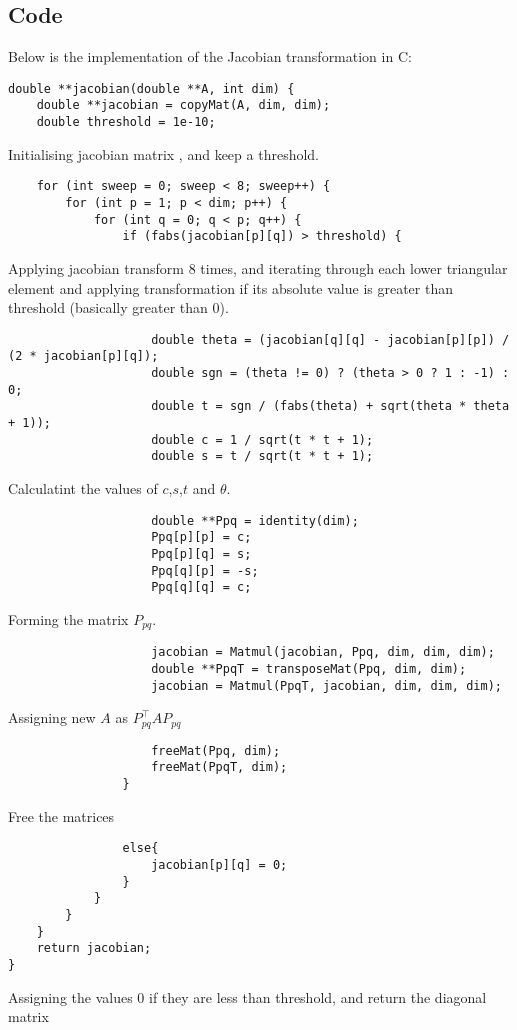 \documentclass[a4paper,12pt]{article}
\theoremstyle{remark}
\begin{document}
\subsection{Code}
Below is the implementation of the Jacobian transformation in C:
\begin{verbatim}
double **jacobian(double **A, int dim) {
    double **jacobian = copyMat(A, dim, dim);
    double threshold = 1e-10;
\end{verbatim}
Initialising jacobian matrix , and keep a threshold.
\begin{verbatim}
    for (int sweep = 0; sweep < 8; sweep++) {
        for (int p = 1; p < dim; p++) {
            for (int q = 0; q < p; q++) {
                if (fabs(jacobian[p][q]) > threshold) {
\end{verbatim}
Applying jacobian transform 8 times, and iterating through each lower triangular element and applying transformation if its absolute value is greater than threshold (basically greater than 0).
\begin{verbatim}
                    double theta = (jacobian[q][q] - jacobian[p][p]) / (2 * jacobian[p][q]);
                    double sgn = (theta != 0) ? (theta > 0 ? 1 : -1) : 0;
                    double t = sgn / (fabs(theta) + sqrt(theta * theta + 1));
                    double c = 1 / sqrt(t * t + 1);
                    double s = t / sqrt(t * t + 1);
\end{verbatim}
Calculatint the values of $c$,$s$,$t$ and $\theta$.
\begin{verbatim}
                    double **Ppq = identity(dim);
                    Ppq[p][p] = c;
                    Ppq[p][q] = s;
                    Ppq[q][p] = -s;
                    Ppq[q][q] = c;

\end{verbatim}
Forming the matrix $P_{pq}$.
\begin{verbatim}
                    jacobian = Matmul(jacobian, Ppq, dim, dim, dim);
                    double **PpqT = transposeMat(Ppq, dim, dim);
                    jacobian = Matmul(PpqT, jacobian, dim, dim, dim);
\end{verbatim}
Assigning new $A$ as $P_{pq}^\top A P_{pq}$ 
\begin{verbatim}
                    freeMat(Ppq, dim);
                    freeMat(PpqT, dim);
                }
\end{verbatim}
Free the matrices
\begin{verbatim}
                else{
                	jacobian[p][q] = 0;
                }
            }
        }
    }
    return jacobian;
}
\end{verbatim}
Assigning the values 0 if they are less than threshold, and return the diagonal matrix
\end{document}
